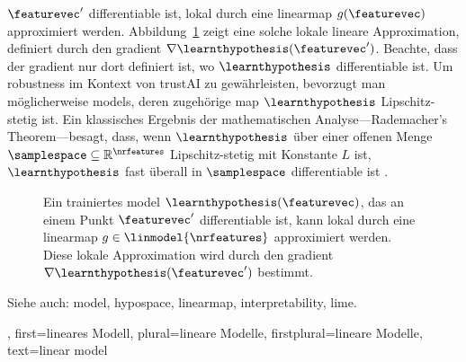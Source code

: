 {{{{{{{{        $\featurevec'$ \gls{differentiable} ist, lokal durch eine \gls{linearmap} $g(\featurevec)$ approximiert werden. 
        Abbildung~\ref{fig_linapprox_dict} zeigt eine solche lokale lineare Approximation, definiert durch den 
        \gls{gradient} $\nabla \learnthypothesis(\featurevec')$. Beachte, dass der \gls{gradient} nur dort definiert 
        ist, wo $\learnthypothesis$ \gls{differentiable} ist.
        Um \gls{robustness} im Kontext von \gls{trustAI} zu gewährleisten, bevorzugt man möglicherweise 
        \glspl{model}, deren zugehörige \gls{map} $\learnthypothesis$ Lipschitz-stetig ist. Ein klassisches Ergebnis 
        der mathematischen Analyse—Rademacher’s Theorem—besagt, dass, wenn $\learnthypothesis$ über einer offenen 
        Menge $\samplespace \subseteq \mathbb{R}^{\nrfeatures}$ Lipschitz-stetig mit Konstante $L$ ist, 
        $\learnthypothesis$ fast überall in $\samplespace$ \gls{differentiable} ist \cite[Th.~3.1]{heinonen2005lectures}.
        \begin{figure}[H]
        \begin{center}
        \caption{
            Ein trainiertes \gls{model} $\learnthypothesis(\featurevec)$, das an einem Punkt $\featurevec'$ 
            \gls{differentiable} ist, kann lokal durch eine \gls{linearmap} $g \in \linmodel{\nrfeatures}$ 
            approximiert werden. Diese lokale Approximation wird durch den \gls{gradient} 
            $\nabla \learnthypothesis(\featurevec')$ bestimmt.}
        \label{fig_linapprox_dict}
        \end{center}
        \end{figure}
        Siehe auch: \gls{model}, \gls{hypospace}, \gls{linearmap}, \gls{interpretability}, \gls{lime}.}, 
    first={lineares Modell},
    plural={lineare Modelle},
    firstplural={lineare Modelle}, 
    text={linear model}
}



}}}}}}
